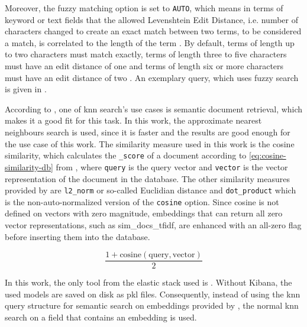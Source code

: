 Moreover, the fuzzy matching option is set to \texttt{AUTO}, which means in terms of keyword or text fields that the allowed Levenshtein Edit Distance, 
i.e. number of characters changed to create an exact match between two terms, to be considered a match, is correlated to the length of the term \cite{Elasticsearch-fuzziness}.
By default, terms of length up to two characters must match exactly, terms of length three to five characters must have an edit distance of one and 
terms of length six or more characters must have an edit distance of two \cite{Elasticsearch-fuzziness}.
An exemplary query, which uses fuzzy search is given in .

According to \citeauthor{Elasticsearch-kNN-HNSW}, one of \ac{knn} search's use cases is semantic document retrieval, which makes it a good fit for this task.
In this work, the approximate nearest neighbours search is used, since it is faster and the results are good enough for the use case of this work.
The similarity measure used in this work is the cosine similarity, which calculates the \texttt{\_score} of a document according to \autoref{eq:cosine-similarity-db} from \cite{Elasticsearch-kNN-similarity}, 
where \texttt{query} is the query vector and \texttt{vector} is the vector representation of the document in the database.
The other similarity measures provided by \databaseName{} are \texttt{l2\_norm} or 
so-called Euclidian distance and \texttt{dot\_product} which is the non-auto-normalized version of the \texttt{cosine} option.
Since cosine is not defined on vectors with zero magnitude, embeddings that can return all zero vector representations, such as sim\_docs\_tfidf, 
are enhanced with an all-zero flag before inserting them into the database.

\begin{equation}
    \frac{1 + \text{cosine}(\text{query}, \text{vector})}{2}
    \label{eq:cosine-similarity-db}
\end{equation}

In this work, the only tool from the elastic stack used is \databaseName{}.
Without Kibana, the used models are saved on disk as \ac{pkl} files.
Consequently, instead of using the \ac{knn} query structure for semantic search on embeddings provided by \databaseName{}, the normal \ac{knn} search on a field that contains an embedding is used.